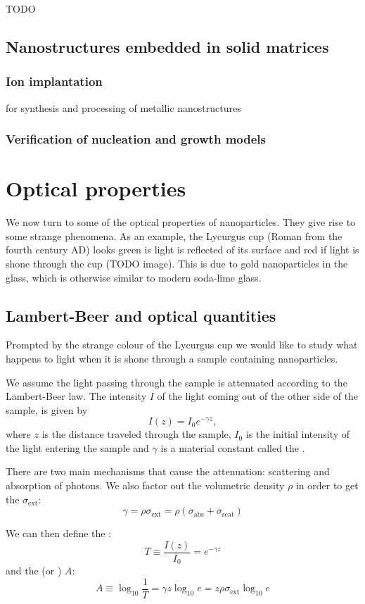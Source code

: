 TODO 
\section{Nanostructures embedded in solid matrices}
\subsection{Ion implantation}
for synthesis and processing of metallic nanostructures
\subsection{Verification of nucleation and growth models}


\chapter{Optical properties}
We now turn to some of the optical properties of nanoparticles. They give rise to some strange phenomena. As an example, the Lycurgus cup (Roman from the fourth century AD) looks green is light is reflected of its surface and red if light is shone through the cup (TODO image). This is due to gold nanoparticles in the glass, which is otherwise similar to modern soda-lime glass.

\section{Lambert-Beer and optical quantities}
Prompted by the strange colour of the Lycurgus cup we would like to study what happens to light when it is shone through a sample containing nanoparticles.

We assume the light passing through the sample is attenuated according to the Lambert-Beer law. The intensity $I$ of the light coming out of the other side of the sample, is given by
\[ I(z) = I_0e^{-\gamma z}, \]
where $z$ is the distance traveled through the sample, $I_0$ is the initial intensity of the light entering the sample and $\gamma$ is a material constant called the .

There are two main mechanisms that cause the attenuation: scattering and absorption of photons. We also factor out the volumetric density $\rho$ in order to get the  $\sigma_\text{ext}$:
\[ \gamma = \rho\sigma_\text{ext} = \rho (\sigma_\text{abs} + \sigma_\text{scat}) \]

We can then define the :
\[ T \equiv \frac{I(z)}{I_0} = e^{-\gamma z} \]
and the  (or ) $A$:
\[ A \equiv \log_{10} \frac{1}{T} = \gamma z \log_{10}e =  z \rho \sigma_\text{ext} \log_{10}e \]


